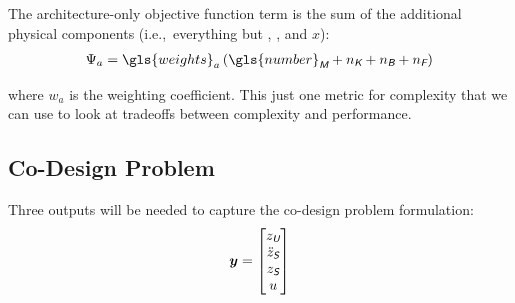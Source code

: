 The architecture-only objective function term is the sum of the additional physical components (i.e.,~everything but , , and $x$):
\begin{align}
\Psi_a = \gls{weights}_a\left( \gls{number}_{\xcolor{M}} + n_{\xcolor{K}} + n_{\xcolor{B}} + n_{\xcolor{F}} \right)
\end{align}

\noindent where $w_a$ is the weighting coefficient.
This just one metric for complexity that we can use to look at tradeoffs between complexity and performance.

\subsection{Co-Design Problem}

Three outputs will be needed to capture the co-design problem formulation:
\begin{align}
\bm{y} = \begin{bmatrix} z_{\textsl{\textsf{U}}} \\ \ddot{z}_{\textsl{\textsf{S}}} \\ z_{\textsl{\textsf{S}}} \\ u \end{bmatrix}
\end{align}


